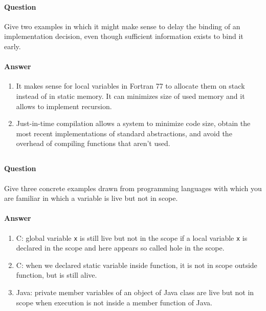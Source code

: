 \documentclass[5pt]{article}
\begin{document}
\paragraph{Question}
Give two examples in which it might make sense to delay the binding of an
implementation decision, even though sufficient information exists to bind
it early.


\paragraph{Answer}
\begin{enumerate}
\item It makes sense for local variables in Fortran 77 to allocate them on stack
instead of in static memory. It can minimizes size of used memory and it allows
to implement recursion.

\item Just-in-time compilation allows a system to minimize code size, obtain the
most recent implementations of standard abstractions, and avoid the overhead of compiling functions that
aren’t used.
\end{enumerate}
\subsection{}

\paragraph{Question}
Give three concrete examples drawn from programming languages with
which you are familiar in which a variable is live but not in scope.


\paragraph{Answer}
\begin{enumerate}
  \item C: global variable \verb|x| is still live but not in the scope if a
  local variable \verb|x| is declared in the scope and here appears so called
  hole in the scope.
  \item C: when we declared static variable inside function, it is not in scope
  outside function, but is still alive.
  \item Java: private member variables of an object of Java class are live but
not in scope when execution is not inside a member function of Java.
\end{enumerate}
\end{document}
